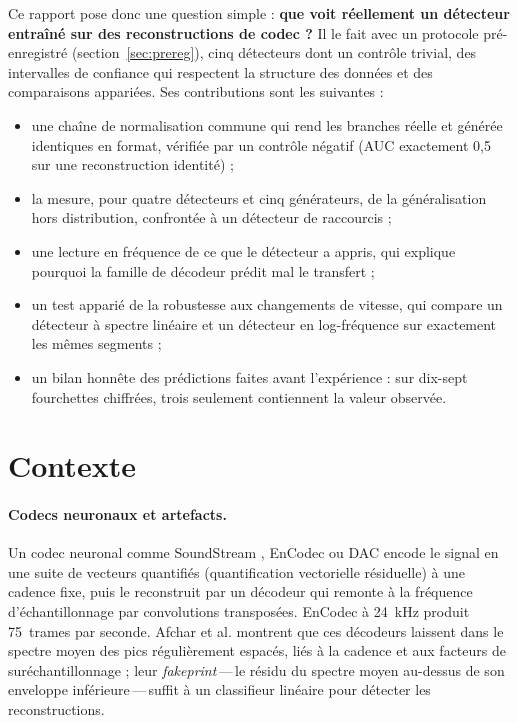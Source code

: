 \documentclass[a4paper, 11pt]{article}
\begin{document}
Ce rapport pose donc une question simple : \textbf{que voit réellement un détecteur entraîné sur des
reconstructions de codec ?} Il le fait avec un protocole pré-enregistré (section~\ref{sec:prereg}), cinq
détecteurs dont un contrôle trivial, des intervalles de confiance qui respectent la structure des données
et des comparaisons appariées. Ses contributions sont les suivantes :
\begin{itemize}
    \item une chaîne de normalisation commune qui rend les branches réelle et générée identiques en
    format, vérifiée par un contrôle négatif (AUC exactement 0,5 sur une reconstruction identité) ;
    \item la mesure, pour quatre détecteurs et cinq générateurs, de la généralisation hors distribution,
    confrontée à un détecteur de raccourcis ;
    \item une lecture en fréquence de ce que le détecteur a appris, qui explique pourquoi la famille de
    décodeur prédit mal le transfert ;
    \item un test apparié de la robustesse aux changements de vitesse, qui compare un détecteur à spectre
    linéaire et un détecteur en log-fréquence sur exactement les mêmes segments ;
    \item un bilan honnête des prédictions faites avant l'expérience : sur dix-sept fourchettes chiffrées,
    trois seulement contiennent la valeur observée.
\end{itemize}

\section{Contexte}

\paragraph{Codecs neuronaux et artefacts.} Un codec neuronal comme SoundStream \cite{zeghidour2021soundstream},
EnCodec \cite{defossez2022encodec} ou DAC \cite{kumar2023dac} encode le signal en une suite de vecteurs
quantifiés (quantification vectorielle résiduelle) à une cadence fixe, puis le reconstruit par un décodeur
qui remonte à la fréquence d'échantillonnage par convolutions transposées. EnCodec à 24~kHz produit
75~trames par seconde. Afchar et al. \cite{afchar2025fourier} montrent que ces décodeurs laissent dans le
spectre moyen des pics régulièrement espacés, liés à la cadence et aux facteurs de suréchantillonnage ;
leur \emph{fakeprint}\,---\,le résidu du spectre moyen au-dessus de son enveloppe inférieure\,---\,suffit à
un classifieur linéaire pour détecter les reconstructions.
\end{document}

